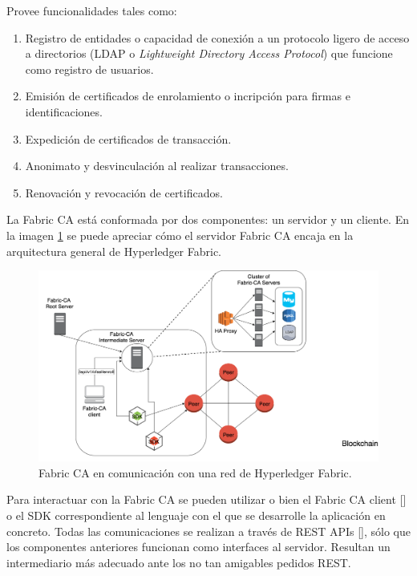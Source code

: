 Provee funcionalidades tales como:
\begin{enumerate}
	\item Registro de entidades o capacidad de conexi\'on a un protocolo ligero de acceso a directorios (LDAP o \emph{Lightweight Directory Access Protocol}) que funcione como registro de usuarios.
	
	\item Emisi\'on de certificados de enrolamiento o incripci\'on para firmas e identificaciones.%
	
	\item Expedici\'on de certificados de transacci\'on.
	
	\item Anonimato y desvinculaci\'on al realizar transacciones.
	
	\item Renovaci\'on y revocaci\'on de certificados.
\end{enumerate}

La Fabric CA est\'a conformada por dos componentes: un servidor y un cliente. En la imagen \ref{fig:cadiagram} se puede apreciar c\'omo el servidor Fabric CA encaja en la arquitectura general de Hyperledger Fabric.

\begin{figure}[h]
	\centering
	\includegraphics[scale=0.3]{Graphics/fabric-ca}
	\caption{Fabric CA en comunicaci\'on con una red de Hyperledger Fabric.}
	\label{fig:cadiagram}
\end{figure}

Para interactuar con la Fabric CA se pueden utilizar o bien el Fabric CA client [\cite{caclient}] o el SDK correspondiente al lenguaje con el que se desarrolle la aplicaci\'on en concreto. Todas las comunicaciones se realizan a trav\'es de REST APIs [\cite{restapifaclient}], s\'olo que los componentes anteriores funcionan como interfaces al servidor. Resultan un intermediario m\'as adecuado ante los no tan amigables pedidos REST.

